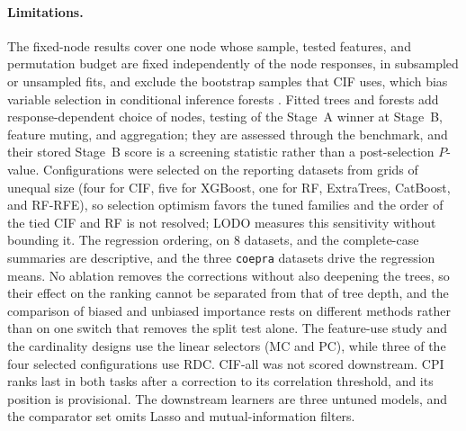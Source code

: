 \paragraph{Limitations.}
The fixed-node results cover one node whose sample, tested features, and
permutation budget are fixed independently of the node responses, in subsampled
or unsampled fits, and exclude the bootstrap samples that CIF uses, which bias
variable selection in conditional inference forests
\citep{Strobl2007BiasRFVariableImportance}. Fitted trees
and forests add response-dependent choice of nodes, testing of the Stage~A
winner at Stage~B, feature muting, and aggregation; they are assessed through
the benchmark, and their stored Stage~B score is a screening statistic
rather than a post-selection $P$-value. Configurations were selected on the
reporting datasets from grids of unequal size (four for CIF, five for XGBoost,
one for RF, ExtraTrees, CatBoost, and RF-RFE), so selection optimism favors the
tuned families and the order of the tied CIF and RF is not resolved; LODO
measures this sensitivity without bounding it. The regression ordering, on 8
datasets, and the complete-case summaries are descriptive, and the three \nolinkurl{coepra} datasets drive the regression
means. No ablation removes the corrections without also deepening the trees, so
their effect on the ranking cannot be separated from that of tree depth, and
the comparison of biased and unbiased importance rests on different methods
rather than on one switch that removes the split test alone. The
feature-use study and the cardinality designs use the linear selectors (MC and PC), while three
of the four selected configurations use RDC. CIF-all was not scored downstream. CPI
ranks last in both tasks after a correction to its correlation threshold, and
its position is provisional. The downstream learners are three untuned models,
and the comparator set omits Lasso and mutual-information filters.
